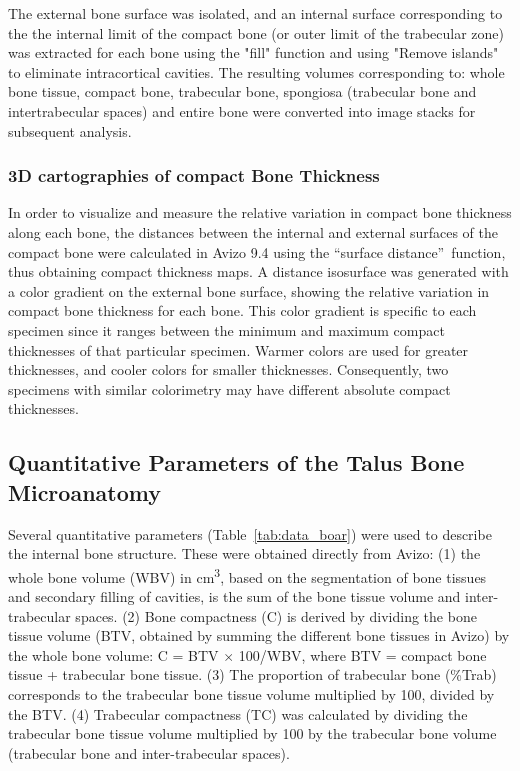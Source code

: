 \documentclass[12pt,a4paper]{article}
\begin{document}
The external bone surface was isolated, and an internal surface corresponding to the the internal limit of the compact bone (or outer limit of the trabecular zone) was extracted for each bone using the "fill" function and using "Remove islands" to eliminate intracortical cavities. The resulting volumes corresponding to: whole bone tissue, compact bone, trabecular bone, spongiosa (trabecular bone and intertrabecular spaces) and entire bone were converted into image stacks for subsequent analysis.
\subsubsection{3D cartographies of compact Bone Thickness}
In order to visualize and measure the relative variation in compact bone thickness along each bone, the distances between the internal and external surfaces of the compact bone were calculated in Avizo 9.4 using the \textquotedblleft surface distance\textquotedblright~function, thus obtaining compact thickness maps. A distance isosurface was generated with a color gradient on the external bone surface, showing the relative variation in compact bone thickness for each bone. This color gradient is specific to each specimen since it ranges between the minimum and maximum compact thicknesses of that particular specimen. Warmer colors are used for greater thicknesses, and cooler colors for smaller thicknesses. Consequently, two specimens with similar colorimetry may have different absolute compact thicknesses.
\subsection{Quantitative Parameters of the Talus Bone Microanatomy}
Several quantitative parameters (Table~\ref{tab:data_boar}) were used to describe the internal bone structure. These were obtained directly from Avizo: (1) the whole bone volume (WBV) in cm\textsuperscript{3}, based on the segmentation of bone tissues and secondary filling of cavities, is the sum of the bone tissue volume and inter-trabecular spaces. (2) Bone compactness (C) is derived by dividing the bone tissue volume (BTV, obtained by summing the different bone tissues in Avizo) by the whole bone volume: C = BTV $\times$ 100/WBV, where BTV = compact bone tissue + trabecular bone tissue. (3) The proportion of trabecular bone (\%Trab) corresponds to the trabecular bone tissue volume multiplied by 100, divided by the BTV. (4) Trabecular compactness (TC) was calculated by dividing the trabecular bone tissue volume multiplied by 100 by the trabecular bone volume (trabecular bone and inter-trabecular spaces). 
\end{document}
